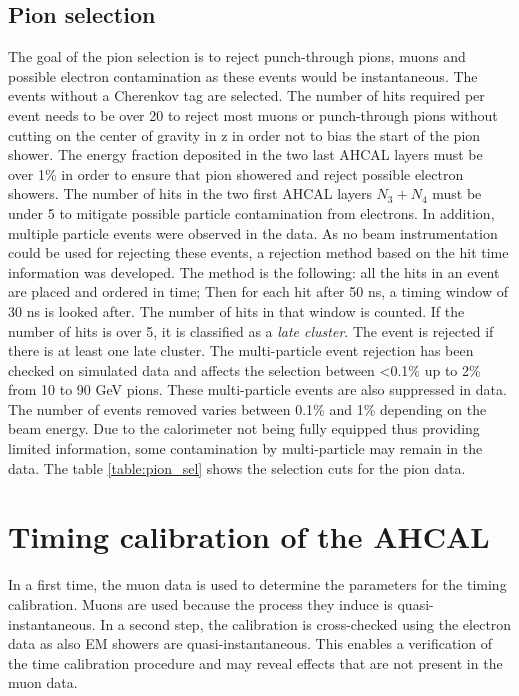 \documentclass{JINST}
\begin{document}
\subsection{Pion selection}
\label{sec:pionsel}

The goal of the pion selection is to reject punch-through pions, muons and possible electron contamination as these events would be instantaneous. The events without a Cherenkov tag are selected. The number of hits required per event needs to be over 20 to reject most muons or punch-through pions without cutting on the center of gravity in z in order not to bias the start of the pion shower. The energy fraction deposited in the two last AHCAL layers must be over 1\% in order to ensure that pion showered and reject possible electron showers. The number of hits in the two first AHCAL layers $N_3+N_4$ must be under 5 to mitigate possible particle contamination from electrons. In addition, multiple particle events were observed in the data. As no beam instrumentation could be used for rejecting these events, a rejection method based on the hit time information was developed. The method is the following: all the hits in an event are placed and ordered in time; Then for each hit after 50 ns, a timing window of 30 ns is looked after. The number of hits in that window is counted. If the number of hits is over 5, it is classified as a \textit{late cluster}. The event is rejected if there is at least one late cluster. The multi-particle event rejection has been checked on simulated data and affects the selection between <0.1\% up to 2\% from 10 to 90 GeV pions. These multi-particle events are also suppressed in data. The number of events removed varies between 0.1\% and 1\% depending on the beam energy. Due to the calorimeter not being fully equipped thus providing limited information, some contamination by multi-particle may remain in the data. The table \ref{table:pion_sel} shows the selection cuts for the pion data.

\section{Timing calibration of the AHCAL}

In a first time, the muon data is used to determine the parameters for the timing calibration. Muons are used because the process they induce is quasi-instantaneous. In a second step, the calibration is cross-checked using the electron data as also EM showers are quasi-instantaneous. This enables a verification of the time calibration procedure and may reveal effects that are not present in the muon data.
\end{document}
